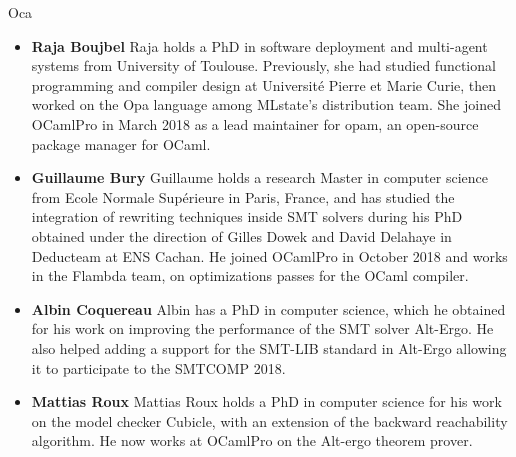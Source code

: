 \begin{sitedescription}{Oca}
\begin{itemize} %
  \item{\bf Raja Boujbel} Raja holds a PhD in software deployment and
    multi-agent systems from University of Toulouse. Previously, she had studied
    functional programming and compiler design at Université Pierre et Marie
    Curie, then worked on the Opa language among MLstate’s distribution team.
    She joined OCamlPro in March 2018 as a lead maintainer for opam, an
    open-source package manager for OCaml.
\item{\bf Guillaume Bury} Guillaume holds a research Master in computer
    science from Ecole Normale Supérieure in Paris, France, and has studied the
    integration of rewriting techniques inside SMT solvers during his PhD
    obtained under the direction of Gilles Dowek and David Delahaye in
    Deducteam at ENS Cachan. He joined OCamlPro in October 2018 and works in
    the Flambda team, on optimizations passes for the OCaml compiler.
\item{\bf Albin Coquereau} Albin has a PhD in computer science,
    which he obtained for his work on improving the performance of the SMT
    solver Alt-Ergo. He also helped adding a support for the SMT-LIB standard
    in Alt-Ergo allowing it to participate to the SMTCOMP 2018.
\item{\bf Mattias Roux} Mattias Roux holds a PhD in computer science
    for his work on the model checker Cubicle, with an extension of the backward
    reachability algorithm. He now works at OCamlPro on the Alt-ergo theorem
    prover.
\end{itemize}

\end{sitedescription}

